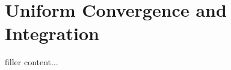 \documentclass[../../templates/section]{subfiles}
\begin{document}
\section{Uniform Convergence and Integration}\label{sec:uniform-convergence-and-integration}

filler content...
\end{document}
